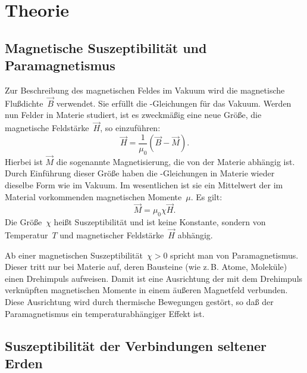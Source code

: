 
\section{Theorie}

\subsection{Magnetische Suszeptibilität und Paramagnetismus}

Zur Beschreibung des magnetischen Feldes im Vakuum wird die magnetische
Flußdichte~$\vec{B}$ verwendet. Sie erfüllt die
-Gleichungen für das Vakuum. Werden nun Felder in Materie
studiert, ist es zweckmäßig eine neue Größe, die magnetische
Feldstärke~$\vec{H}$, so einzuführen:
\begin{equation}
  \vec{H} = \frac{1}{\mu_0}(\vec{B} - \vec{M}).
\end{equation}
Hierbei ist $\vec{M}$ die sogenannte Magnetisierung, die von der Materie
abhängig ist. Durch Einführung dieser Größe haben die
-Gleichungen in Materie wieder dieselbe Form wie im
Vakuum. Im wesentlichen ist sie ein Mittelwert der im Material
vorkommenden magnetischen Momente~$\mu$. Es gilt:
\begin{equation}
  \vec{M} = \mu_0 \chi \vec{H}.
\end{equation}
Die Größe~$\chi$ heißt Suszeptibilität und ist keine Konstante, sondern
von Temperatur~$T$ und magnetischer Feldstärke~$\vec{H}$ abhängig.

Ab einer magnetischen Suszeptibilität~$\chi>0$ spricht man von
Paramagnetismus. Dieser tritt nur bei Materie auf, deren Bausteine (wie
z.\,B. Atome, Moleküle) einen Drehimpuls aufweisen. Damit ist eine
Ausrichtung der mit dem Drehimpuls verknüpften magnetischen Momente in
einem äußeren Magnetfeld verbunden. Diese Ausrichtung wird durch
thermische Bewegungen gestört, so daß der Paramagnetismus ein
temperaturabhängiger Effekt ist.

\subsection{Suszeptibilität der Verbindungen seltener Erden}
